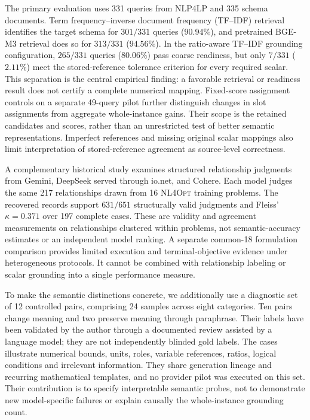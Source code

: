 \documentclass[pdflatex,sn-basic,Numbered]{sn-jnl}
\begin{document}
The primary evaluation uses 331 queries from \textsc{NLP4LP} \cite{nlp4lp_dataset} and 335 schema documents. Term frequency--inverse document frequency (TF--IDF) retrieval identifies the target schema for $301/331$ queries ($90.94\%$), and pretrained BGE-M3 retrieval does so for $313/331$ ($94.56\%$). In the ratio-aware TF--IDF grounding configuration, $265/331$ queries ($80.06\%$) pass coarse readiness, but only $7/331$ ($2.11\%$) meet the stored-reference tolerance criterion for every required scalar. This separation is the central empirical finding: a favorable retrieval or readiness result does not certify a complete numerical mapping. Fixed-score assignment controls on a separate 49-query pilot further distinguish changes in slot assignments from aggregate whole-instance gains. Their scope is the retained candidates and scores, rather than an unrestricted test of better semantic representations. Imperfect references and missing original scalar mappings also limit interpretation of stored-reference agreement as source-level correctness.

A complementary historical study examines structured relationship judgments from Gemini, DeepSeek served through io.net, and Cohere. Each model judges the same 217 relationships drawn from 16 \textsc{NL4Opt} training problems. The recovered records support $631/651$ structurally valid judgments and Fleiss' $\kappa=0.371$ over 197 complete cases. These are validity and agreement measurements on relationships clustered within problems, not semantic-accuracy estimates or an independent model ranking. A separate common-18 formulation comparison provides limited execution and terminal-objective evidence under heterogeneous protocols. It cannot be combined with relationship labeling or scalar grounding into a single performance measure.

To make the semantic distinctions concrete, we additionally use a diagnostic set of 12 controlled pairs, comprising 24 samples across eight categories. Ten pairs change meaning and two preserve meaning through paraphrase. Their labels have been validated by the author through a documented review assisted by a language model; they are not independently blinded gold labels. The cases illustrate numerical bounds, units, roles, variable references, ratios, logical conditions and irrelevant information. They share generation lineage and recurring mathematical templates, and no provider pilot was executed on this set. Their contribution is to specify interpretable semantic probes, not to demonstrate new model-specific failures or explain causally the whole-instance grounding count.
\end{document}
